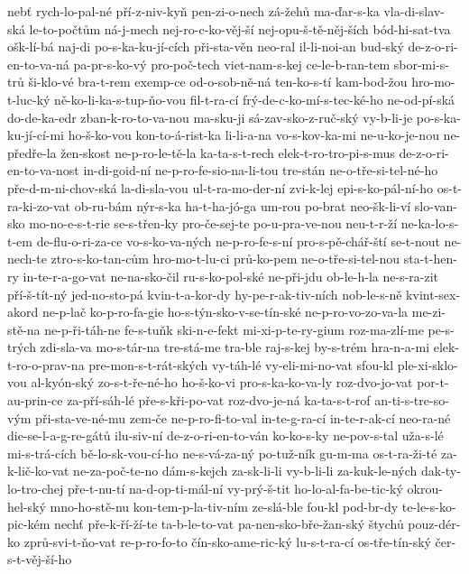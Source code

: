 nebť
rych-lo-pal-né
pří-z-niv-kyň
pen-zi-o-nech
zá-žehů
ma-ďar-s-ka
vla-di-slav-ská
le-to-počtům
ná-j-mech
nej-ro-c-ko-věj-ší
nej-opu-š-tě-něj-ších
bód-hi-sat-tva
ošk-lí-bá
naj-di
po-s-ka-ku-jí-cích
při-sta-věn
neo-ral
il-li-noi-an
bud-ský
de-z-o-ri-en-to-va-ná
pa-pr-s-ko-vý
pro-poč-tech
viet-nam-s-kej
ce-le-b-ran-tem
sbor-mi-s-trů
ši-klo-vé
bra-t-rem
exemp-ce
od-o-sob-ně-ná
ten-ko-s-tí
kam-bod-žou
hro-mo-t-luc-ký
ně-ko-li-ka-s-tup-ňo-vou
fil-t-ra-cí
frý-de-c-ko-mí-s-tec-ké-ho
ne-od-pí-ská
do-de-ka-edr
zban-k-ro-to-va-nou
ma-sku-ji
sá-zav-sko-z-ruč-ský
vy-b-li-je
po-s-ka-ku-jí-cí-mi
ho-š-ko-vou
kon-to-á-rist-ka
li-li-a-na
vo-s-kov-ka-mi
ne-u-ko-je-nou
ne-předře-la
žen-skost
ne-p-ro-le-tě-la
ka-ta-s-t-rech
elek-t-ro-tro-pi-s-mus
de-z-o-ri-en-to-va-nost
in-di-goid-ní
ne-p-ro-fe-sio-na-li-tou
tre-stán
ne-o-tře-si-tel-né-ho
pře-d-m-ni-chov-ská
la-di-sla-vou
ul-t-ra-mo-der-ní
zvi-k-lej
epi-s-ko-pál-ní-ho
os-t-ra-ki-zo-vat
ob-ru-bám
nýr-s-ka
ha-t-ha-jó-ga
um-rou
po-brat
neo-šk-li-ví
slo-van-sko
mo-no-e-s-t-rie
se-s-třen-ky
pro-če-sej-te
po-u-pra-ve-nou
neu-t-r-ží
ne-ka-lo-s-t-em
de-flu-o-ri-za-ce
vo-s-ko-va-ných
ne-p-ro-fe-s-ní
pro-s-pě-chář-ští
se-t-nout
ne-nech-te
ztro-s-ko-tan-cům
hro-mo-t-lu-ci
prů-ko-pem
ne-o-tře-si-tel-nou
sta-t-hen-ry
in-te-r-a-go-vat
ne-na-sko-čil
ru-s-ko-pol-ské
ne-při-jdu
ob-le-h-la
ne-s-ra-zit
pří-š-tít-ný
jed-no-sto-pá
kvin-t-a-kor-dy
hy-pe-r-ak-tiv-ních
nob-le-s-ně
kvint-sex-akord
ne-p-lač
ko-p-ro-fa-gie
ho-s-týn-sko-v-se-tín-ské
ne-p-ro-vo-zo-va-la
me-zi-stě-na
ne-p-ři-táh-ne
fe-s-tuňk
ski-n-e-fekt
mi-xi-p-te-ry-gium
roz-ma-zlí-me
pe-s-trých
zdi-sla-va
mo-s-tár-na
tre-stá-me
tra-ble
raj-s-kej
by-s-trém
hra-n-a-mi
elek-t-ro-o-prav-na
pre-mon-s-t-rát-ských
vy-táh-lé
vy-eli-mi-no-vat
sfou-kl
ple-xi-sklo-vou
al-kyón-ský
zo-s-t-ře-né-ho
ho-š-ko-vi
pro-s-ka-ko-va-ly
roz-dvo-jo-vat
por-t-au-prin-ce
za-pří-sáh-lé
pře-s-kři-po-vat
roz-dvo-je-ná
ka-ta-s-t-rof
an-ti-s-tre-so-vým
při-sta-ve-né-mu
zem-če
ne-p-ro-fi-to-val
in-te-g-ra-cí
in-te-r-ak-cí
neo-ra-né
die-se-l-a-g-re-gátů
ilu-siv-ní
de-z-o-ri-en-to-ván
ko-ko-s-ky
ne-pov-s-tal
uža-s-lé
mi-s-trá-cích
bě-lo-sk-vou-cí-ho
ne-s-vá-za-ný
po-tuž-ník
gu-m-ma
os-t-ra-ži-té
za-k-lič-ko-vat
ne-za-poč-te-no
dám-s-kejch
za-sk-li-li
vy-b-li-li
za-kuk-le-ných
dak-ty-lo-tro-chej
pře-t-nu-tí
na-d-op-ti-mál-ní
vy-prý-š-tit
ho-lo-al-fa-be-tic-ký
okrou-hel-ský
mno-ho-stě-nu
kon-tem-p-la-tiv-ním
ze-slá-ble
fou-kl
pod-br-dy
te-le-s-ko-pic-kém
nechť
pře-k-ří-ží-te
ta-b-le-to-vat
pa-nen-sko-bře-žan-ský
štychů
pouz-dér-ko
zprů-svi-t-ňo-vat
re-p-ro-fo-to
čín-sko-ame-ric-ký
lu-s-t-ra-cí
os-tře-tín-ský
čer-s-t-věj-ší-ho
